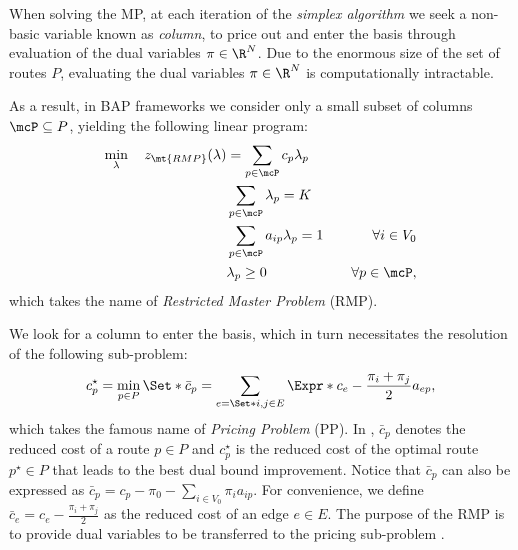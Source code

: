 When solving the MP,
at each iteration of the \textit{simplex algorithm} \parencite{dantzig1955}
we seek a non-basic variable known as \textit{column},
to price out and enter the basis through evaluation of the dual variables $\pi \in \R^N$.
Due to the enormous size of the set of routes $P$,
evaluating the dual variables $\pi \in \R^{N}$ is computationally intractable.

\medskip

As a result, in BAP frameworks we consider only a small subset of columns $\mcP \subseteq P$,
yielding the following linear program:
\begin{align}
	\min_{\lambda} \quad z_\mt{RMP}(\lambda) & = \sum_{p \in \mcP}  c_p \lambda_p      & \label{eq:rmp-obj-func}                                                                                                    \\
	                                         & \sum_{p \in \mcP} \lambda_{p} = K       & \label{eq:rmp-K-routes}                                                                                                    \\
	                                         & \sum_{p \in \mcP}  a_{ip} \lambda_p = 1 & \quad \forall i \in V_0                                              \label{eq:rmp-customers-visited-by-exactly-one-route} \\
	                                         & \lambda_p \ge 0                         & \quad \forall p \in \mcP \label{eq:rmp-lambda-mip-var-bounds},
\end{align}
which takes the name of \textit{Restricted Master Problem} (RMP).

We look for a column to enter the basis,
which in turn necessitates the resolution of the following sub-problem:
\begin{equation}\label{eq:pp-problem}
	{c^\star_p} = \min_{p \in P} \Set*{ \bar{c}_p = \sum_{e = \Set*{i, j} \in E} \Expr*{c_{e} - \frac{\pi_i + \pi_j}{2}} a_{ep}  },
\end{equation}
which takes the famous name of \textit{Pricing Problem} (PP).
In , $\bar{c}_p$ denotes the reduced cost of a route $p \in P$
and $c^\star_p$ is the reduced cost of the optimal route $p^\star \in P$
that leads to the best dual bound improvement.
Notice that $\bar{c}_p$ can also be expressed as $\bar{c}_p = c_p - \pi_0 - \sum_{i \in V_0} \pi_i a_{ip}$.
For convenience,
we define $\bar{c}_{e} = c_{e} - \frac{\pi_i + \pi_j}{2}$
as the reduced cost of an edge $e\in E$.
The purpose of the RMP is to provide dual variables
to be transferred to the pricing sub-problem \parencite{lubbecke2005}.

